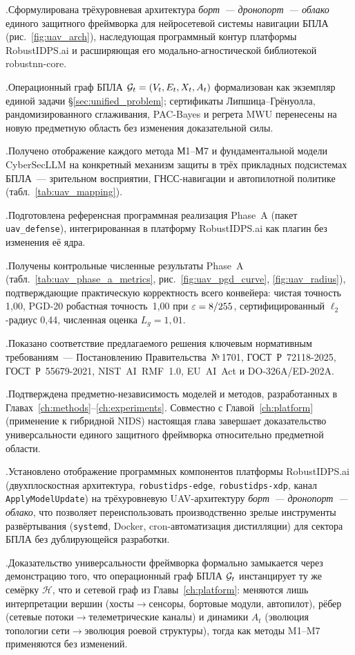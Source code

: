 .\quad Сформулирована трёхуровневая архитектура \emph{борт~---
дронопорт~--- облако} единого защитного фреймворка для нейросетевой
системы навигации БПЛА (рис.~\ref{fig:uav_arch}), наследующая
программный контур платформы \textsf{RobustIDPS.ai} и расширяющая его
модально-агностической библиотекой \textsf{robustnn-core}.

.\quad Операционный граф БПЛА $\mathcal{G}_t = (V_t,E_t,X_t,A_t)$
формализован как экземпляр единой задачи \S\ref{sec:unified_problem};
сертификаты Липшица--Грёнуолла, рандомизированного сглаживания,
PAC-Bayes и регрета MWU перенесены на новую предметную область без
изменения доказательной силы.

.\quad Получено отображение каждого метода \textsf{М1}--\textsf{М7}
и фундаментальной модели \textsf{CyberSecLLM} на конкретный механизм
защиты в трёх прикладных подсистемах БПЛА~--- зрительном восприятии,
ГНСС-навигации и автопилотной политике (табл.~\ref{tab:uav_mapping}).

.\quad Подготовлена референсная программная реализация
Phase~A (пакет \texttt{uav\_defense}), интегрированная в платформу
\textsf{RobustIDPS.ai} как плагин без изменения её ядра.

.\quad Получены контрольные численные результаты Phase~A
(табл.~\ref{tab:uav_phase_a_metrics}, рис.~\ref{fig:uav_pgd_curve},
\ref{fig:uav_radius}), подтверждающие практическую корректность всего
конвейера: чистая точность 1,00, PGD-20 робастная точность~1,00 при
$\varepsilon=8/255$, сертифицированный $\ell_2$-радиус 0,44, численная
оценка $L_g=1{,}01$.

.\quad Показано соответствие предлагаемого решения ключевым
нормативным требованиям~--- Постановлению Правительства~№\,1701,
\mbox{ГОСТ~Р~72118-2025}, \mbox{ГОСТ~Р~55679-2021},
\mbox{NIST~AI~RMF~1.0}, \mbox{EU~AI~Act} и \mbox{DO-326A/ED-202A}.

.\quad Подтверждена предметно-независимость моделей и
методов, разработанных в Главах~\ref{ch:methods}--\ref{ch:experiments}.
Совместно с Главой~\ref{ch:platform} (применение к гибридной NIDS)
настоящая глава завершает доказательство универсальности единого
защитного фреймворка относительно предметной области.

.\quad Установлено отображение программных компонентов
платформы \textsf{RobustIDPS.ai} (двухплоскостная архитектура,
\texttt{robustidps-edge}, \texttt{robustidps-xdp}, канал
\texttt{ApplyModelUpdate}) на трёхуровневую UAV-архитектуру
\emph{борт~--- дронопорт~--- облако}, что позволяет переиспользовать
производственно зрелые инструменты развёртывания (\texttt{systemd},
Docker, cron-автоматизация дистилляции) для сектора БПЛА без
дублирующейся разработки.

.\quad Доказательство универсальности фреймворка
формально замыкается через демонстрацию того, что операционный
граф БПЛА $\mathcal{G}_t$ инстанцирует ту же семёрку $\mathcal{H}$, что
и сетевой граф из Главы~\ref{ch:platform}: меняются лишь
интерпретации вершин (хосты$\to$сенсоры, бортовые модули,
автопилот), рёбер (сетевые потоки$\to$телеметрические каналы) и
динамики $A_t$ (эволюция топологии сети$\to$эволюция роевой
структуры), тогда как методы M1--M7 применяются без изменений.
